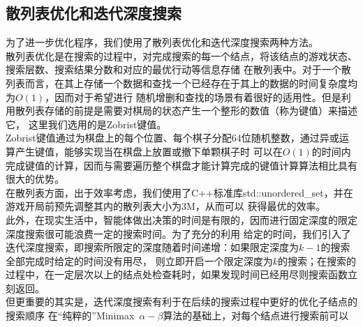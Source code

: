 \documentclass{acm_proc_article-sp}
\begin{document}
\subsection{\textbf{散列表优化和迭代深度搜索}}
为了进一步优化程序，我们使用了散列表优化和迭代深度搜索两种方法。\\
散列表优化是在搜索的过程中，对完成搜索的每一个结点，将该结点的游戏状态、搜索层数、搜索结果分数和对应的最优行动等信息存储
在散列表中。对于一个散列表而言，在其上存储一个数据和查找一个已经存在于其上的数据的时间复杂度均为$O(1)$，因而对于希望进行
随机增删和查找的场景有着很好的适用性。但是利用散列表存储的前提是需要对棋局的状态产生一个整形的数值（称为键值）来描述它，
这里我们选用的是Zobrist键值。\\
Zobrist键值通过为棋盘上的每个位置、每个棋子分配64位随机整数，通过异或运算产生键值，能够实现当在棋盘上放置或撤下单颗棋子时
可以在$O(1)$的时间内完成键值的计算，因而与需要遍历整个棋盘才能计算完成的键值计算算法相比具有很大的优势。\\
在散列表方面，出于效率考虑，我们使用了C++标准库std::unordered_set，并在游戏开局前预先调整其内的散列表大小为3M，从而可以
获得最优的效率。\\
此外，在现实生活中，智能体做出决策的时间是有限的，因而进行固定深度的限定深度搜索很可能浪费一定的搜索时间。为了充分的利用
给定的时间，我们引入了迭代深度搜索，即搜索所限定的深度随着时间递增：如果限定深度为$k-1$的搜索全部完成时给定的时间没有用尽，
则立即开启一个限定深度为$k$的搜索；在搜索的过程中，在一定层次以上的结点处检查耗时，如果发现时间已经用尽则搜索函数立刻返回。\\
但更重要的其实是，迭代深度搜索有利于在后续的搜索过程中更好的优化子结点的搜索顺序
在“纯粹的”Minimax\ $\alpha-\beta$算法的基础上，对每个结点进行搜索前可以
\end{document}
